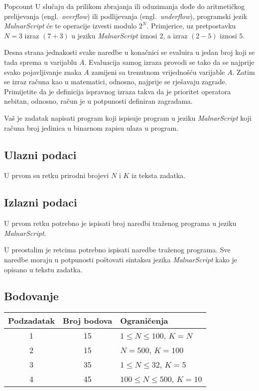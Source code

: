 \begin{statement}[
  problempoints=110,
  timelimit=1 sekunda,
  memorylimit=512 MiB,
]{Popcount}
U slučaju da prilikom zbrajanja ili oduzimanja dođe do aritmetičkog
prelijevanja (engl.\ \textit{overflow}) ili podlijevanja (engl.\
\textit{underflow}), programski jezik \textit{MalnarScript} će te operacije
izvesti modulo $2^N$. Primjerice, uz pretpostavku $N=3$ izraz $(7+3)$ u jeziku
\textit{MalnarScript} iznosi $2$, a izraz $(2-5)$ iznosi $5$.

Desna strana jednakosti svake naredbe u konačnici se evaluira u jedan broj koji
se tada sprema u varijablu $A$. Evaluacija samog izraza provodi se tako da se
najprije svako pojavljivanje znaka $A$ zamijeni sa trenutnom vrijednošću
varijable $A$. Zatim se izraz računa kao u matematici, odnosno, najprije se
rješavaju zagrade. Primijetite da je definicija ispravnog izraza takva da je
prioritet operatora nebitan, odnosno, račun je u potpunosti definiran
zagradama.

Vaš je zadatak napisati program koji ispisuje program u jeziku
\textit{MalnarScript} koji računa broj jedinica u binarnom zapisu ulaza u
program.

\subsection*{Ulazni podaci}
U prvom su retku prirodni brojevi $N$ i $K$ iz teksta zadatka.

\subsection*{Izlazni podaci}
U prvom retku potrebno je ispisati broj naredbi traženog programa u jeziku
\textit{MalnarScript}.

U preostalim je retcima potrebno ispisati naredbe traženog programa. Sve
naredbe moraju u potpunosti poštovati sintaksu jezika \textit{MalnarScript}
kako je opisano u tekstu zadatka.

\subsection*{Bodovanje}
{\renewcommand{\arraystretch}{1.4}
  \setlength{\tabcolsep}{6pt}
  \begin{tabular}{ccl}
 Podzadatak & Broj bodova & Ograničenja \\ \midrule
  1 & 15 & $1 \le N \le 100$, $K = N$ \\
  2 & 15 & $N = 500$, $K = 100$ \\
  3 & 35 & $1 \le N \le 32$, $K=5$ \\
  4 & 45 & $100 \le N \le 500$, $K=10$
\end{tabular}}


\end{statement}
